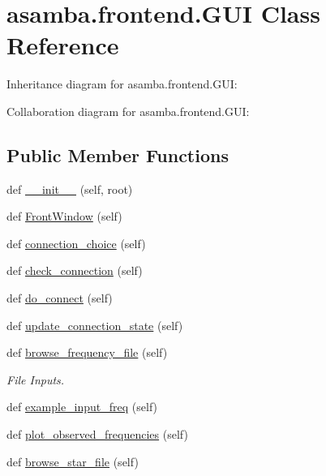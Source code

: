 \hypertarget{classasamba_1_1frontend_1_1_g_u_i}{}\section{asamba.\+frontend.\+G\+UI Class Reference}
\label{classasamba_1_1frontend_1_1_g_u_i}


Inheritance diagram for asamba.\+frontend.\+G\+UI\+:


Collaboration diagram for asamba.\+frontend.\+G\+UI\+:
\subsection*{Public Member Functions}
\begin{DoxyCompactItemize}
\item 
def \hyperlink{classasamba_1_1frontend_1_1_g_u_i_adff8117b4f723520f100119d38f9b567}{\+\_\+\+\_\+init\+\_\+\+\_\+} (self, root)
\item 
def \hyperlink{classasamba_1_1frontend_1_1_g_u_i_acaec11d5fbe0228d9da0e3ba10a4ea33}{Front\+Window} (self)
\item 
def \hyperlink{classasamba_1_1frontend_1_1_g_u_i_a4c88f62e31fe47af19c81215df643945}{connection\+\_\+choice} (self)
\item 
def \hyperlink{classasamba_1_1frontend_1_1_g_u_i_aacca71c626bd1753c1277e13b5ad8eec}{check\+\_\+connection} (self)
\item 
def \hyperlink{classasamba_1_1frontend_1_1_g_u_i_afb43aa6632c5aa17f9cf4a0270659a7f}{do\+\_\+connect} (self)
\item 
def \hyperlink{classasamba_1_1frontend_1_1_g_u_i_a905cc040d83a85cd64003f98b859a64a}{update\+\_\+connection\+\_\+state} (self)
\item 
def \hyperlink{classasamba_1_1frontend_1_1_g_u_i_aece59ad9eaff01043c324f9fa2175c98}{browse\+\_\+frequency\+\_\+file} (self)
\begin{DoxyCompactList}\small\item\em File Inputs. \end{DoxyCompactList}\item 
def \hyperlink{classasamba_1_1frontend_1_1_g_u_i_a515d6655fbf006441ec5ac9b96e5bd7c}{example\+\_\+input\+\_\+freq} (self)
\item 
def \hyperlink{classasamba_1_1frontend_1_1_g_u_i_addc94b5d78cdf85660cc6b2b61377252}{plot\+\_\+observed\+\_\+frequencies} (self)
\item 
def \hyperlink{classasamba_1_1frontend_1_1_g_u_i_a092f06f2cb8a31817b414a34f9dc52cf}{browse\+\_\+star\+\_\+file} (self)

\end{DoxyCompactItemize}
